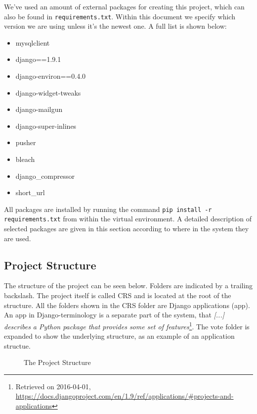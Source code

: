 We've used an amount of external packages for creating this project, which can also be found in \texttt{requirements.txt}. Within this document we specify which version we are using unless it's the newest one. A full list is shown below:

\begin{itemize}
    \item mysqlclient
    \item django==1.9.1
    \item django-environ==0.4.0
    \item django-widget-tweaks
    \item django-mailgun
    \item django-super-inlines
    \item pusher
    \item bleach
    \item django\_compressor
    \item short\_url
\end{itemize}

All packages are installed by running the command \texttt{pip install -r requirements.txt} from within the virtual environment. A detailed description of selected packages are given in this section according to where in the system they are used.

\subsection{Project Structure}
The structure of the project can be seen below. Folders are indicated by a trailing backslash. The project itself is called CRS and is located at the root of the structure. All the folders shown in the CRS folder are Django applications (app). An app in Django-terminology is a separate part of the system, that \emph{[...] describes a Python package that provides some set of features}\footnote{Retrieved on 2016-04-01, \url{https://docs.djangoproject.com/en/1.9/ref/applications/\#projects-and-applications}}. The vote folder is expanded to show the underlying structure, as an example of an application structue.

\begin{figure}[H]
    \caption{The Project Structure}
    \label{fig:project-structure}
\end{figure}

